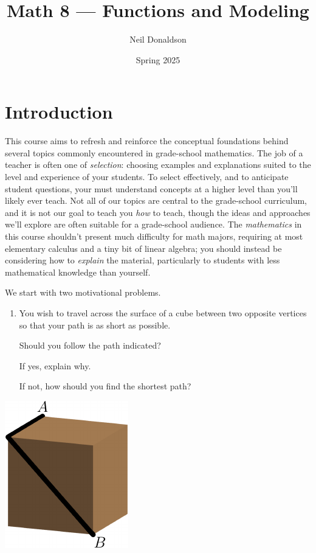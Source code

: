 \graphicspath{{1functions/asy/}}
\thispagestyle{empty}

\title{Math 8 --- Functions and Modeling}
\author{Neil Donaldson}
\date{Spring 2025}
\maketitle	

\section*{Introduction}

This course aims to refresh and reinforce the conceptual foundations behind several topics commonly encountered in grade-school mathematics. The job of a teacher is often one of \emph{selection}: choosing examples and explanations suited to the level and experience of your students. To select effectively, and to anticipate student questions, your must understand concepts at a higher level than you'll likely ever teach. Not all of our topics are central to the grade-school curriculum, and it is not our goal to teach you \emph{how} to teach, though the ideas and approaches we'll explore are often suitable for a grade-school audience. The \emph{mathematics} in this course shouldn't present much difficulty for math majors, requiring at most elementary calculus and a tiny bit of linear algebra; you should instead be considering how to \emph{explain} the material, particularly to students with less mathematical knowledge than yourself.\par

\begin{minipage}[t]{0.72\linewidth}\vspace{0pt}
	We start with two motivational problems.\footnotemark
	\begin{enumerate}
	  \item You wish to travel across the surface of a cube between two opposite vertices so that your path is as short as possible.\par
	  Should you follow the path indicated?\par
	  If yes, explain why.\par
	  If not, how should you find the shortest path?
	\end{enumerate}
\end{minipage}
\hfill
\begin{minipage}[t]{0.25\linewidth}\vspace{-10pt}
	\flushright
	\includegraphics{intro-cube_0}
\end{minipage}
\smallbreak


